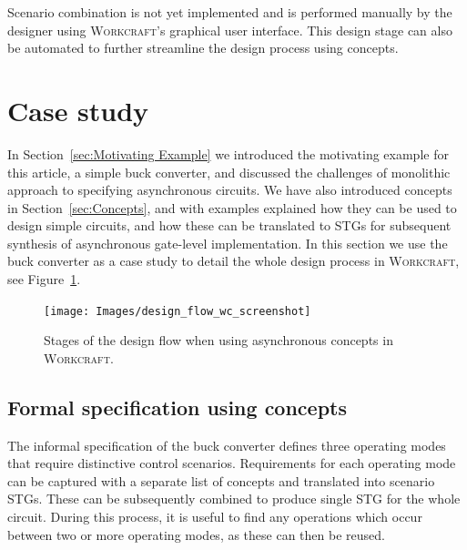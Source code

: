 \documentclass[british, journal]{IEEEtran}
\newcommand{\noun}[1]{\textsc{#1}}
\begin{document}
Scenario combination is not yet implemented and is performed manually by
the designer using \noun{Workcraft}'s graphical user interface. This
design stage can also be automated to further streamline the design process
using concepts.

\vspace{-1mm}
\section{Case study\label{sec:case-study}}

In Section~\ref{sec:Motivating Example} we introduced the motivating example for
this article, a simple buck converter, and discussed the challenges of monolithic
approach to specifying asynchronous circuits. We have also introduced
concepts in Section~\ref{sec:Concepts}, and with examples explained how they can
be used to design simple circuits, and how these can be translated to STGs
for subsequent synthesis of asynchronous gate-level implementation.
In this section we use the buck converter as a case study to detail the
whole design process in \noun{Workcraft}, see Figure~\ref{fig:workcraft_screenshot}.

\begin{figure}[t]
\begin{centering}
\texttt{[image: Images/design\_flow\_wc\_screenshot]}
\par\end{centering}

\protect\caption{\label{fig:workcraft_screenshot}Stages of the design flow when using asynchronous concepts in \noun{Workcraft}.}
\vspace{-4mm}
\end{figure}

\subsection{Formal specification using concepts}

The informal specification of the buck converter defines three operating modes
that require distinctive control scenarios. Requirements for each operating mode
can be captured with a separate list of concepts and translated into scenario
STGs. These can be subsequently combined to produce single STG for the whole circuit.
During this process, it is useful to find any operations which occur
between two or more operating modes, as these can then be reused.
\end{document}
